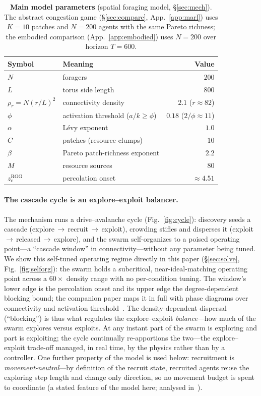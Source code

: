\documentclass{article}
\begin{document}
\begin{table}[t]
\centering
{\small
\begin{tabular}{@{}llr@{}}
\hline
\textbf{Symbol} & \textbf{Meaning} & \textbf{Value} \\
\hline
$N$ & foragers & $200$ \\
$L$ & torus side length & $800$ \\
$\rho_r=N(r/L)^2$ & connectivity density & $2.1$ ($r\approx82$) \\
$\phi$ & activation threshold ($a/k\ge\phi$) & $0.18$ ($2/\phi\approx11$) \\
$\alpha$ & L\'evy exponent & $1.0$ \\
$C$ & patches (resource clumps) & $10$ \\
$\beta$ & Pareto patch-richness exponent & $2.2$ \\
$M$ & resource sources & $80$ \\
$z_c^{\mathrm{RGG}}$ & percolation onset & ${\approx}4.51$ \\
\hline
\end{tabular}}
\caption{\textbf{Main model parameters} (spatial foraging model, \S\ref{sec:mech}). The abstract congestion
game (\S\ref{sec:compare}, App.~\ref{app:marl}) uses $K{=}10$ patches and $N{=}200$ agents with the same Pareto
richness; the embodied comparison (App.~\ref{app:embodied}) uses $N{=}200$ over horizon $T{=}600$.}
\label{tab:params}
\end{table}

\paragraph{The cascade cycle is an explore--exploit balancer.} The mechanism runs a drive--avalanche cycle
(Fig.~\ref{fig:cycle}): discovery seeds a cascade (explore\,$\to$\,recruit\,$\to$\,exploit), crowding stifles
and disperses it (exploit\,$\to$\,released\,$\to$\,explore), and the swarm self-organizes to a poised operating
point---a ``cascade window'' in connectivity---without any parameter being tuned. We show this self-tuned
operating regime directly in this paper (\S\ref{sec:solve}, Fig.~\ref{fig:selforg}): the swarm holds a
subcritical, near-ideal-matching operating point across a $60\times$ density range with no per-condition
tuning. The window's lower edge is the percolation onset and its upper edge the degree-dependent blocking
bound; the companion paper maps it in full with phase diagrams over connectivity and activation
threshold~\citep{partI}. The density-dependent dispersal (``blocking'') is thus what regulates the
explore--exploit \emph{balance}---how much of the swarm explores versus exploits. At any instant part of the
swarm is exploring and part is exploiting; the cycle continually re-apportions the two---the explore--exploit
trade-off managed, in real time, by the physics rather than by a controller. One further property of the
model is used below: recruitment is \emph{movement-neutral}---by definition of the recruit state, recruited
agents reuse the exploring step length and change only direction, so no movement budget is spent to
coordinate (a stated feature of the model here; analysed in~\citep{partI}).
\end{document}
